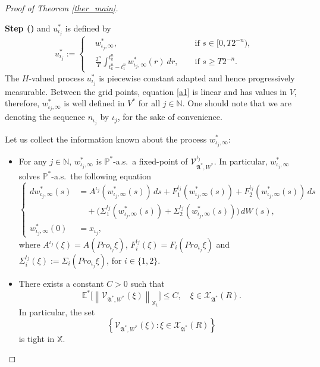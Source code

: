 \documentclass[english,a4paper,11pt]{amsart}
\theoremstyle{plain}
\theoremstyle{definition}
\theoremstyle{remark}
\numberwithin{equation}{section}
\newcounter{lil1}
\newenvironment{step}
{\begin{list} { \bf Step (\Roman{lil1})}
		{ \usecounter{lil1}
			\setlength{\leftmargin}{0.0cm}
			\setlength{\topsep}{0.2cm}
			\setlength{\itemsep}{0.0cm}
			\setlength{\parsep}{0.1cm}
			\setlength{\itemindent}{0.8cm}
			\setlength{\parskip}{0.0cm}}}
	{\end{list}}
\newcounter{lil33}
\newcounter{lil1q}
\newcommand{\NN}{\mathbb{N}}
\newcommand{\PP}{{\mathbb{P}}}
\newcommand{\Pro}{Pro}
\begin{document}
\begin{proof}[Proof of Theorem \ref{ther_main}]
\begin{step}
	and $u_{\iota_j}^\ast $ is
	defined by 
	\begin{equation*}
		 u_{\iota_j}^\ast:=
		\left\{
		\begin{aligned} &w_{\iota_j,\infty}^\ast, &&
		\mbox{ if } s\in [0,T2^{-n}),
		\\
		&\frac{2^n}{T}	\int_{t^n_{k}-t^n_1}^{t^n_k} w_{\iota_j,\infty}^\ast(r)\: dr, &&\mbox{ if
		} s \geq  T2^{-n} .
	\end{aligned} 
\right.
	\end{equation*}
	{The $H$-valued process} $u_{\iota_j}^\ast$ is
	piecewise constant {adapted and}  hence progressively measurable.
	Between the grid points, equation \eqref{a1} is linear and has values in $V$, therefore,
	${w}_{\iota_j,\infty}^\ast$ is well defined in $V^\ast$ for all $j\in{\mathbb{N}}$. One should note that we are denoting the sequence $n_{\iota_j}$ by $\iota_j$, for the sake of convenience.
%
	
	Let us collect the information known about the process ${w}_{\iota_j,\infty}^\ast$:
\begin{itemize}
	\item  {For any $j\in\NN$,  $w^\ast_{\iota_j,\infty}$ is {$\PP^\ast$}-a.s.\ a fixed-point of  $	\mathcal{V}_{\mathfrak{A}^\ast,W^\ast}^{\iota_j}$. In particular,  $w^\ast_{\iota_j,\infty}$ solves  {$\PP^\ast$}-a.s.\ the following equation
		\begin{equation} \label{8.1}
			\left\{\begin{aligned}
				d w^\ast_{\iota_j,\infty}(s)&=A^{{\iota_j}}(w^\ast_{\iota_j,\infty}(s))\,ds+F_1^{\iota_j}(w^\ast_{\iota_j,\infty}(s))+F_2^{\iota_j}(w^\ast_{\iota_j,\infty}(s))\,ds\\&\quad +\big(\Sigma_1^{{\iota_j}}(w^\ast_{\iota_j,\infty}(s)) +\Sigma_2^{{\iota_j}}(w^\ast_{\iota_j,\infty}(s))\big)\, d W(s)  ,
				\\
				w^\ast_{\iota_j,\infty}(0)&=x_{\iota_j},
			\end{aligned}\right.
		\end{equation}
		where $A^{{\iota_j}}(\xi)=A(\Pro_{{\iota_j}}\xi)$, $F_i^{\iota_j}(\xi)=F_i(\Pro_{\iota_j}\xi )$ and 	$\Sigma_i^{{\iota_j}} (\xi):=  \Sigma_i(\Pro_{{\iota_j}}\xi)$, for $i\in\{1,2\}$.}	
	
	\item There exists a constant $C>0$ such that
	\[
	\mathbb{E}^{\ast} \big[\left\| \mathcal{V}_{\mathfrak{A}^{\ast},W^{\ast}}(\xi) \right\|_{\mathbb{X}_1} \big]\leq C, \quad \xi \in \mathcal{X}_{\mathfrak{A}^{\ast}}(R).
	\]
	In particular, the set
	\[
	\left\{ \mathcal{V}_{\mathfrak{A}^{\ast},W^{\ast}}(\xi) : \xi \in \mathcal{X}_{\mathfrak{A}^{\ast}}(R) \right\}
	\]
	is tight in $\mathbb{X}$.
	

\end{itemize}
\end{step}
\end{proof}
\end{document}
